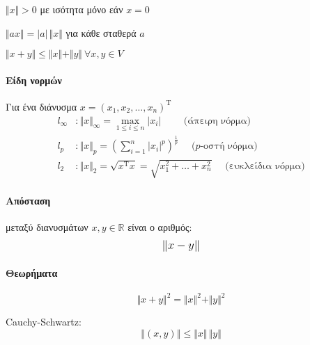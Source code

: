 \documentclass[11pt,a4paper,notitlepage,fleqn]{article}
\begin{document}
	\begin{enumroman}
		\item \( \Vert x\Vert > 0 \) με ισότητα μόνο εάν \( x=0 \)
		\item \( \Vert ax\Vert = |a|\,\Vert x\Vert \) για κάθε σταθερά \( a \)
		\item \( \Vert x+y\Vert \leq \Vert x\Vert+\Vert y\Vert \ \forall x,y\in V  \)
	\end{enumroman}
	
	\paragraph{Είδη νορμών}
	Για ένα διάνυσμα \( x=(x_1,x_2,\dots,x_n)^{\mathrm T} \)
	\begin{align*}
		l_{\infty} &: \Vert x\Vert _{\infty} = \max_{1\leq i \leq n}|x_i|
		\qquad \text{ (άπειρη νόρμα)}
		\\
		l_p &: \Vert x\Vert _{p} =
		\left(\sum_{i=1}^n |x_i|^p\right)^{\frac{1}{p}}
		\quad \text{ ($p$-οστή νόρμα)}
		\\
		l_2 &: \Vert x\Vert _2 = \sqrt{x^{\mathrm T}x} =
		\sqrt{x_1^2 + \dots + x_n^2}
		\quad \text{ (ευκλείδια νόρμα)}
	\end{align*}
	
	\paragraph{Απόσταση}
	μεταξύ διανυσμάτων \( x,y \in \mathbb R  \) είναι ο αριθμός:
	\[
    \mathlarger{\Vert x-y\Vert }
	\]
	
	\paragraph{Θεωρήματα}
	\[
	\Vert x+y\Vert ^2 = \Vert x\Vert ^2 + \Vert y\Vert ^2
	\]
	
	Cauchy-Schwartz:
	\[
	\left\Vert(x,y)\right\Vert \leq \Vert x\Vert \,\Vert y\Vert 
	\]
	
\end{document}
